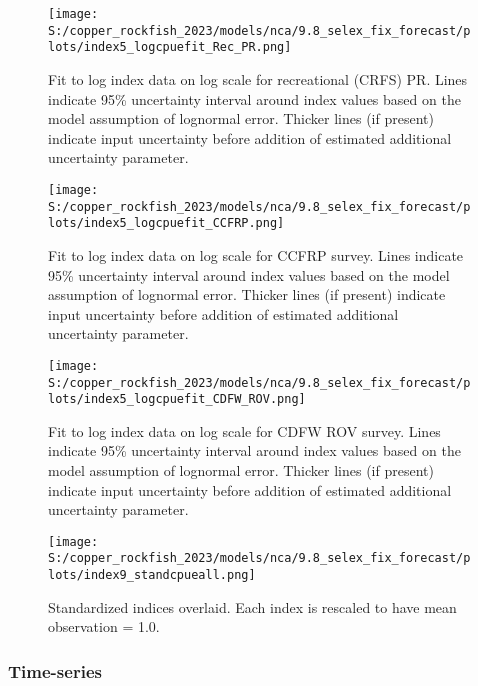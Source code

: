 \documentclass[
  letterpaper,
]{article}
\begin{document}
\pagebreak

\begin{figure}
\centering
\texttt{[image: S:/copper\_rockfish\_2023/models/nca/9.8\_selex\_fix\_forecast/plots/index5\_logcpuefit\_Rec\_PR.png]}
\caption{Fit to log index data on log scale for recreational (CRFS) PR. Lines indicate 95\% uncertainty interval around index values based on the model assumption of lognormal error. Thicker lines (if present) indicate input uncertainty before addition of estimated additional uncertainty parameter.\label{fig:crfs-pr-index-fit}}
\end{figure}

\pagebreak

\begin{figure}
\centering
\texttt{[image: S:/copper\_rockfish\_2023/models/nca/9.8\_selex\_fix\_forecast/plots/index5\_logcpuefit\_CCFRP.png]}
\caption{Fit to log index data on log scale for CCFRP survey. Lines indicate 95\% uncertainty interval around index values based on the model assumption of lognormal error. Thicker lines (if present) indicate input uncertainty before addition of estimated additional uncertainty parameter.\label{fig:ccfrp-index-fit}}
\end{figure}

\pagebreak

\begin{figure}
\centering
\texttt{[image: S:/copper\_rockfish\_2023/models/nca/9.8\_selex\_fix\_forecast/plots/index5\_logcpuefit\_CDFW\_ROV.png]}
\caption{Fit to log index data on log scale for CDFW ROV survey. Lines indicate 95\% uncertainty interval around index values based on the model assumption of lognormal error. Thicker lines (if present) indicate input uncertainty before addition of estimated additional uncertainty parameter.\label{fig:rov-index-fit}}
\end{figure}

\pagebreak

\begin{figure}
\centering
\texttt{[image: S:/copper\_rockfish\_2023/models/nca/9.8\_selex\_fix\_forecast/plots/index9\_standcpueall.png]}
\caption{Standardized indices overlaid. Each index is rescaled to have mean observation = 1.0.\label{fig:standardized-indices}}
\end{figure}

\pagebreak

\hypertarget{time-series}{%
\subsubsection{Time-series}\label{time-series}}
\end{document}
